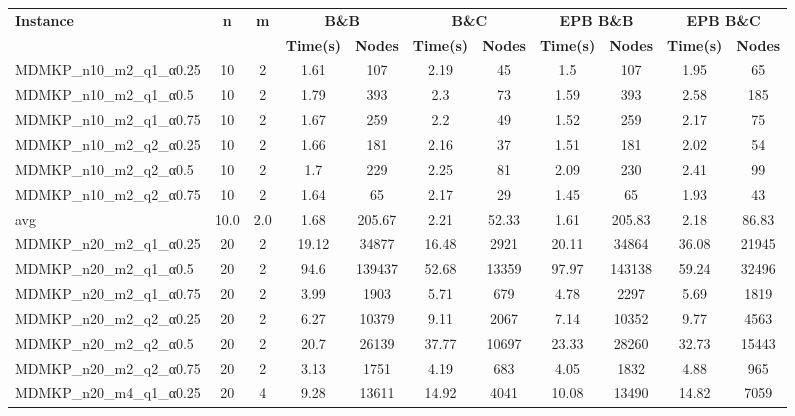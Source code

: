 \begin{table}[!ht]
\centering
\hspace*{-1cm}\begin{tabular}{lcccccccccc}
\toprule
\textbf{Instance} & \textbf{n} & \textbf{m} & \multicolumn{2}{c}{\textbf{B\&B}} & \multicolumn{2}{c}{\textbf{B\&C}}  & \multicolumn{2}{c}{\textbf{EPB B\&B}} & \multicolumn{2}{c}{\textbf{EPB B\&C}} \\

\cmidrule(r){4-5} \cmidrule(r){6-7} \cmidrule(r){8-9} \cmidrule(r){10-11} 
~ & ~ & ~ & \textbf{Time(s)} &\textbf{Nodes} & \textbf{Time(s)} &\textbf{Nodes} & \textbf{Time(s)} &\textbf{Nodes} & \textbf{Time(s)} &\textbf{Nodes}  \\
\midrule

MDMKP\_n10\_m2\_q1\_α0.25 & 10 & 2 & 1.61 & 107 & 2.19 & 45 & 1.5 & 107 & 1.95 & 65 \\
MDMKP\_n10\_m2\_q1\_α0.5 & 10 & 2 & 1.79 & 393 & 2.3 & 73 & 1.59 & 393 & 2.58 & 185 \\
MDMKP\_n10\_m2\_q1\_α0.75 & 10 & 2 & 1.67 & 259 & 2.2 & 49 & 1.52 & 259 & 2.17 & 75 \\
MDMKP\_n10\_m2\_q2\_α0.25 & 10 & 2 & 1.66 & 181 & 2.16 & 37 & 1.51 & 181 & 2.02 & 54 \\
MDMKP\_n10\_m2\_q2\_α0.5 & 10 & 2 & 1.7 & 229 & 2.25 & 81 & 2.09 & 230 & 2.41 & 99 \\
MDMKP\_n10\_m2\_q2\_α0.75 & 10 & 2 & 1.64 & 65 & 2.17 & 29 & 1.45 & 65 & 1.93 & 43 \\
\hline avg & 10.0 & 2.0 & 1.68& 205.67 & 2.21& 52.33 & 1.61& 205.83 & 2.18& 86.83\\ \hline
MDMKP\_n20\_m2\_q1\_α0.25 & 20 & 2 & 19.12 & 34877 & 16.48 & 2921 & 20.11 & 34864 & 36.08 & 21945 \\
MDMKP\_n20\_m2\_q1\_α0.5 & 20 & 2 & 94.6 & 139437 & 52.68 & 13359 & 97.97 & 143138 & 59.24 & 32496 \\
MDMKP\_n20\_m2\_q1\_α0.75 & 20 & 2 & 3.99 & 1903 & 5.71 & 679 & 4.78 & 2297 & 5.69 & 1819 \\
MDMKP\_n20\_m2\_q2\_α0.25 & 20 & 2 & 6.27 & 10379 & 9.11 & 2067 & 7.14 & 10352 & 9.77 & 4563 \\
MDMKP\_n20\_m2\_q2\_α0.5 & 20 & 2 & 20.7 & 26139 & 37.77 & 10697 & 23.33 & 28260 & 32.73 & 15443 \\
MDMKP\_n20\_m2\_q2\_α0.75 & 20 & 2 & 3.13 & 1751 & 4.19 & 683 & 4.05 & 1832 & 4.88 & 965 \\
MDMKP\_n20\_m4\_q1\_α0.25 & 20 & 4 & 9.28 & 13611 & 14.92 & 4041 & 10.08 & 13490 & 14.82 & 7059 \\

\end{tabular}
\end{table}
